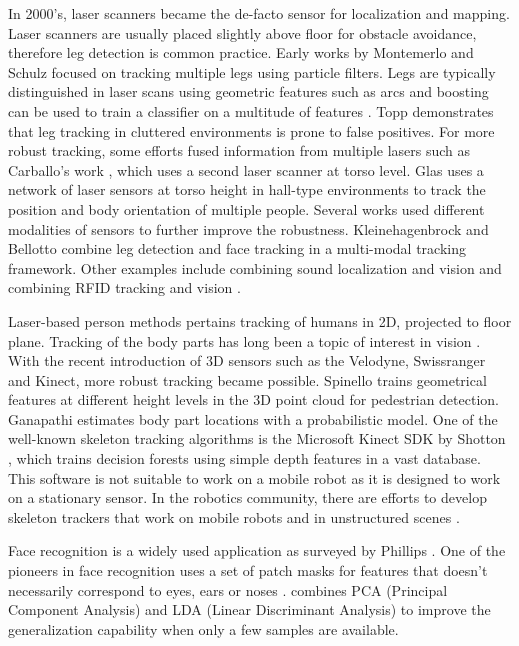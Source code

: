 \documentclass[12pt]{gatech-thesis}
\begin{document}
In 2000's, laser scanners became the de-facto sensor for localization and mapping. Laser scanners are usually placed slightly above floor for obstacle avoidance, therefore leg detection is common practice. Early works by Montemerlo \cite{montemerlo2002conditional} and Schulz \cite{schulz2001tracking} focused on tracking multiple legs using particle filters. Legs are typically distinguished in laser scans using geometric features such as arcs \cite{xavier2005fast} and boosting can be used to train a classifier on a multitude of features \cite{arras2007using}. Topp \cite{topp2005tracking} demonstrates that leg tracking in cluttered environments is prone to false positives. For more robust tracking, some efforts fused information from multiple lasers such as Carballo's work \cite{Carballo2008}, which uses a second laser scanner at torso level. Glas \cite{glas2009laser} uses a network of laser sensors at torso height in hall-type environments to track the position and body orientation of multiple people. Several works used different modalities of sensors to further improve the robustness. Kleinehagenbrock \cite{kleinehagenbrock2002person} and Bellotto \cite{bellotto2009multisensor} combine leg detection and face tracking in a multi-modal tracking framework. Other examples include combining sound localization and vision \cite{bernardin2007audio} and combining RFID tracking and vision \cite{germa2010vision}.

Laser-based person methods pertains tracking of humans in 2D, projected to floor plane. Tracking of the body parts has long been a topic of interest in vision \cite{baumberg1997learning,sidenbladh2000stochastic}. With the recent introduction of 3D sensors such as the Velodyne, Swissranger and Kinect, more robust tracking became possible. Spinello \cite{spinello2010layered} trains geometrical features at different height levels in the 3D point cloud for pedestrian detection. Ganapathi \cite{ganapathi2010real} estimates body part locations with a probabilistic model. One of the well-known skeleton tracking algorithms is the Microsoft Kinect SDK by Shotton \cite{shotton2013real}, which trains decision forests using simple depth features in a vast database. This software is not suitable to work on a mobile robot as it is designed to work on a stationary sensor. In the robotics community, there are efforts to develop skeleton trackers that work on mobile robots and in unstructured scenes \cite{buys2013adaptable}.

Face recognition is a widely used application as surveyed by Phillips \cite{phillips2005overview}. One of the pioneers in face recognition uses a set of patch masks for features that doesn't necessarily correspond to eyes, ears or noses \cite{turk1991face}. \cite{zhao1998discriminant} combines PCA (Principal Component Analysis) and LDA (Linear Discriminant Analysis) to improve the generalization capability when only a few samples are available.
\end{document}
